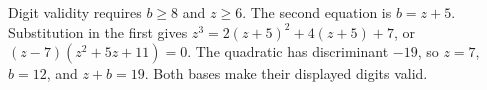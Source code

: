 Digit validity requires $b\ge8$ and $z\ge6$. The second equation is $b=z+5$. Substitution in the first gives $z^3=2(z+5)^2+4(z+5)+7$, or $(z-7)(z^2+5z+11)=0$. The quadratic has discriminant $-19$, so $z=7$, $b=12$, and $\boxed{z+b=19}$. Both bases make their displayed digits valid.
